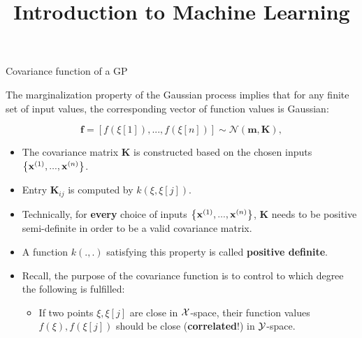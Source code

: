 




\newcommand{\titlefigure}{figure_man/covariance2D-2.png}
\newcommand{\learninggoals}{
  \item Know that covariance functions encodes key assumptions about the GP
  \item Know commonly used covariance functions
}

\title{Introduction to Machine Learning}
\date{}




\begin{vbframe}{Covariance function of a GP}

  The marginalization property of the Gaussian process implies that for any finite set of input values, the corresponding vector of function values is Gaussian:

  $$
    \bm{f} = \left[f\left(\xi[1]\right), ..., f\left(\xi[n]\right)\right] \sim \mathcal{N}\left(\bm{m}, \bm{K}\right),
  $$ 


\begin{itemize}
  \item The covariance matrix $\bm{K}$ is constructed based on the chosen inputs $\left\{\mathbf{x}^{(1)}, ..., \mathbf{x}^{(n)}\right\}$.
  \item Entry $\bm{K}_{ij}$ is computed by $k\left(\xi, \xi[j]\right)$.
  \item Technically, for \textbf{every} choice of inputs $\left\{\mathbf{x}^{(1)}, ..., \mathbf{x}^{(n)}\right\}$, $\bm{K}$ needs to be positive semi-definite in order to be a valid covariance matrix.
  \item A function $k(.,.)$ satisfying this property is called \textbf{positive definite}.

\framebreak 

  \item Recall, the purpose of the covariance function is to control to which degree the following is fulfilled: \vspace*{0.4cm}
  \begin{itemize}
    \item[] If two points $\xi, \xi[j]$ are close in $\mathcal{X}$-space, their function values $f(\xi), f(\xi[j])$ should be close (\textbf{correlated}!) in $\mathcal{Y}$-space.
  \end{itemize} \vspace*{0.4cm}


\end{itemize}
\end{vbframe}
